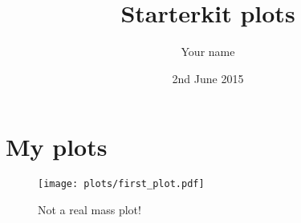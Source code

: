 \documentclass[12pt]{article}
\title{Starterkit plots}
\author{Your name}
\date{2nd June 2015}
\begin{document}
\maketitle

\section{My plots}

\begin{figure}[h]
    \texttt{[image: plots/first\_plot.pdf]}
    \caption{Not a real mass plot!}
\end{figure}
\end{document}
